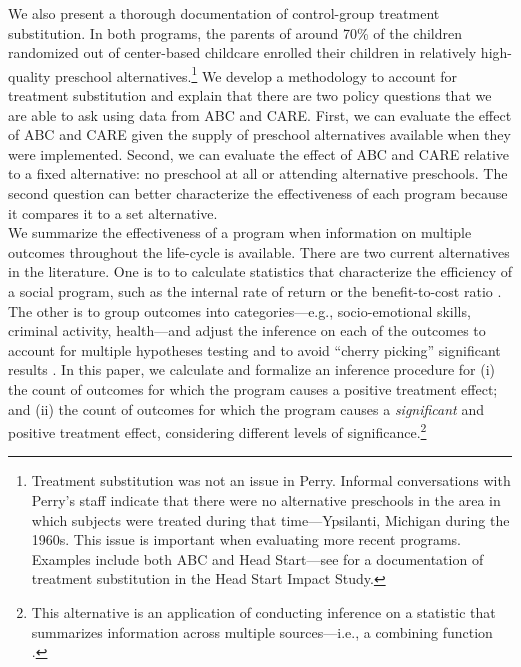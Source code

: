 \noindent We also present a thorough documentation of control-group treatment substitution. In both programs, the parents of around 70\% of the children randomized out of center-based childcare enrolled their children in relatively high-quality preschool alternatives.\footnote{Treatment substitution was not an issue in Perry. Informal conversations with Perry's staff indicate that there were no alternative preschools in the area in which subjects were treated during that time---Ypsilanti, Michigan during the 1960s. This issue is important when evaluating more recent programs. Examples include both ABC and Head Start---see \citep{Puma_Bell_etal_2010_HeadStartImpact} for a documentation of treatment substitution in the Head Start Impact Study.} We develop a methodology to account for treatment substitution and explain that there are two policy questions that we are able to ask using data from ABC and CARE. First, we can evaluate the effect of ABC and CARE given the supply of preschool alternatives available when they were implemented. Second, we can evaluate the effect of ABC and CARE relative to a fixed alternative: no preschool at all or attending alternative preschools. The second question can better characterize the effectiveness of each program because it compares it to a set alternative.\\

\noindent We summarize the effectiveness of a program when information on multiple outcomes throughout the life-cycle is available. There are two current alternatives in the literature. One is to to calculate statistics that characterize the efficiency of a social program, such as the internal rate of return or the benefit-to-cost ratio \citep{Heckman_Moon_etal_2010_RateofReturn}. The other is to group outcomes into categories---e.g., socio-emotional skills, criminal activity, health---and adjust the inference on each of the outcomes to account for multiple hypotheses testing and to avoid ``cherry picking'' significant results \citep{Lehman_Romano_2005_AnnStat,Lehmann_Romano_2005_testing,Heckman_Moon_etal_2010_QE}. In this paper, we calculate and formalize an inference procedure for (i) the count of outcomes for which the program causes a positive treatment effect; and (ii) the count of outcomes for which the program causes a \emph{significant} and positive treatment effect, considering different levels of significance.\footnote{This alternative is an application of conducting inference on a statistic that summarizes information across multiple sources---i.e., a combining function \citep{Pesarin_Salmaso_2010_PermutationTests}.}\\

